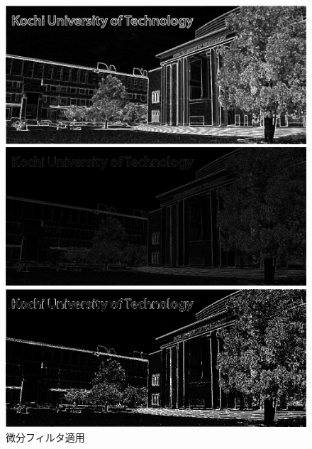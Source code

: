 \begin{figure}[h]
\begin{minipage}[b]{.3\textwidth}
    \end{minipage}
    \begin{minipage}[b]{.3\textwidth}
        \centering
        \includegraphics[keepaspectratio,width=\textwidth]{../../Figures/06_33_diff-img.png}
    \end{minipage}
    \caption{微分フィルタ適用}
    \begin{minipage}[b]{.3\textwidth}
        \centering
        \includegraphics[keepaspectratio,width=\textwidth]{../../Figures/06_41_lf-img}
    \end{minipage}
    \begin{minipage}[b]{.3\textwidth}
        \centering
        \includegraphics[keepaspectratio,width=\textwidth]{../../Figures/06_43_lf-img-thresholding.png}

\end{minipage}
\end{figure}
